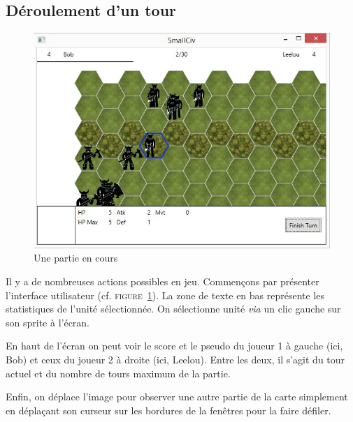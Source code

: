 \subsection{Déroulement d'un tour}
\begin{figure}[h]
	\centering
	\includegraphics{img/jeu.jpg}
	\caption{Une partie en cours}
	\label{in_game}
\end{figure}
Il y a de nombreuses actions possibles en jeu. Commençons par présenter l'interface utilisateur (cf. \textsc{figure~\ref{in_game}}). La zone de texte en bas représente les statistiques de l'unité sélectionnée. On sélectionne unité \textit{via} un clic gauche sur son sprite à l'écran.\newline

En haut de l'écran on peut voir le score et le pseudo du joueur 1 à gauche (ici, Bob) et ceux du joueur 2 à droite (ici, Leelou). Entre les deux, il s'agit du tour actuel et du nombre de tours maximum de la partie. \newline

Enfin, on déplace l'image pour observer une autre partie de la carte simplement en déplaçant son curseur sur les bordures de la fenêtres pour la faire défiler. \newline

